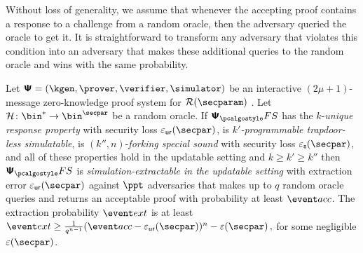 Without loss of generality, we assume that whenever the accepting proof contains a
response to a challenge from a random oracle, then the adversary queried the oracle
to get it. It is straightforward to transform any adversary that violates this
condition into an adversary that makes these additional queries to the random oracle
and wins with the same probability.

\begin{theorem}
  \label{thm:se}
  Let $\ps = (\kgen, \prover, \verifier, \simulator)$ be an interactive
  $(2 \mu + 1)$-message zero-knowledge proof system for $\RELGEN(\secparam)$
  . Let
  $\ro\colon \bin^{*} \to \bin^{\secpar}$ be a random oracle. If $\psfs$ has the
  $k$-\emph{unique response property} with security loss $\epsur(\secpar)$, is
  \emph{$k'$-programmable trapdoor-less simulatable}, is $(k'', n)$-\emph{forking
    special sound} with security loss $\epss(\secpar)$, and all of these properties
  hold in the updatable setting and $k \geq k' \geq k''$ then $\psfs$ is
  \emph{simulation-extractable in the updatable setting} with extraction error
  $\epsur(\secpar)$ against $\ppt$ adversaries that makes up to $q$ random oracle
  queries and returns an acceptable proof with probability at least $\accProb$.  The
  extraction probability $\extProb$ is at least
  \( \extProb \geq \frac{1}{q^{n - 1}} (\accProb - \epsur(\secpar))^{n}
  -\eps(\secpar)\,, \) for some negligible $\eps(\secpar)$.
\end{theorem}
